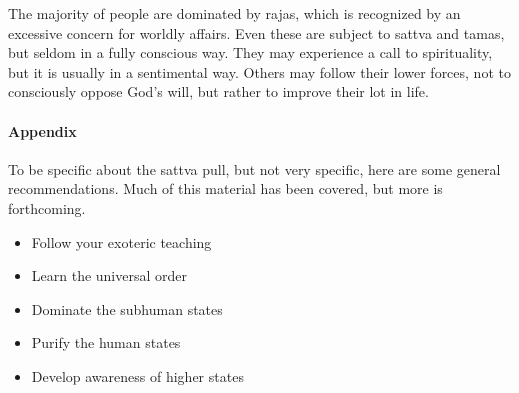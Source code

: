 The majority of people are dominated by rajas, which is recognized by an excessive concern for worldly affairs. Even these are subject to sattva and tamas, but seldom in a fully conscious way. They may experience a call to spirituality, but it is usually in a sentimental way. Others may follow their lower forces, not to consciously oppose God's will, but rather to improve their lot in life.

\paragraph{Appendix}


To be specific about the sattva pull, but not very specific, here are some general recommendations. Much of this material has been covered, but more is forthcoming.

\begin{itemize}


\item Follow your exoteric teaching

\item Learn the universal order

\item Dominate the subhuman states

\item Purify the human states

\item Develop awareness of higher states
\end{itemize}




